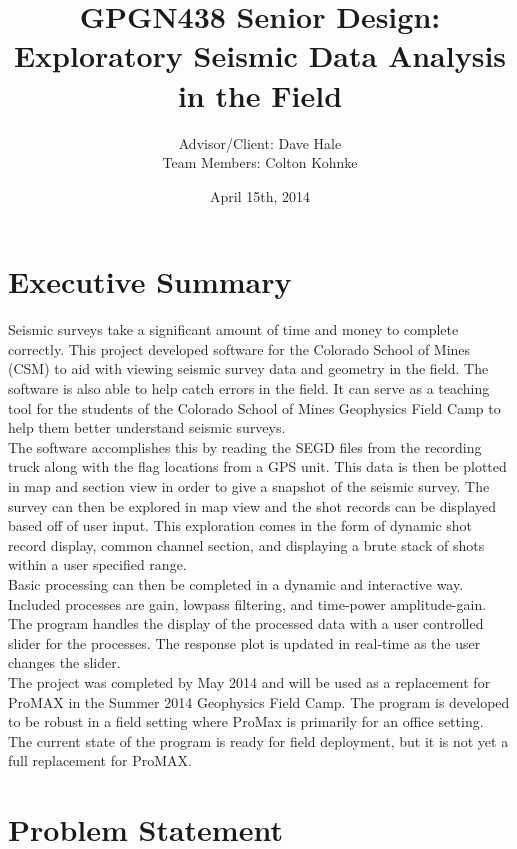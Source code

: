 \documentclass[12pt]{article}
\author{Advisor/Client: Dave Hale \\ Team Members: Colton Kohnke}
\title{GPGN438 Senior Design: \\ Exploratory Seismic Data Analysis in the Field}
\date{April 15th, 2014}
\begin{document}
\maketitle
\newpage

\tableofcontents
\listoffigures
\listoftables
\newpage

\section{Executive Summary}

Seismic surveys take a significant amount of time and money to complete correctly. This project developed software for the Colorado School of Mines (CSM) to aid with viewing seismic survey data and geometry in the field. The software is also able to help catch errors in the field. It can serve as a teaching tool for the students of the Colorado School of Mines Geophysics Field Camp to help them better understand seismic surveys. \\

The software accomplishes this by reading the SEGD files from the recording truck along with the flag locations from a GPS unit. This data is then be plotted in map and section view in order to give a snapshot of the seismic survey. The survey can then be explored in map view and the shot records can be displayed based off of user input. This exploration comes in the form of dynamic shot record display, common channel section, and displaying a brute stack of shots within a user specified range.\\

Basic processing can then be completed in a dynamic and interactive way. Included processes are gain, lowpass filtering, and time-power amplitude-gain. The program handles the display of the processed data with a user controlled slider for the processes. The response plot is updated in real-time as the user changes the slider. \\

The project was completed by May 2014 and will be used as a replacement for ProMAX in the Summer 2014 Geophysics Field Camp. The program is developed to be robust in a field setting where ProMax is primarily for an office setting. The current state of the program is ready for field deployment, but it is not yet a full replacement for ProMAX. 

\section{Problem Statement}
\end{document}
